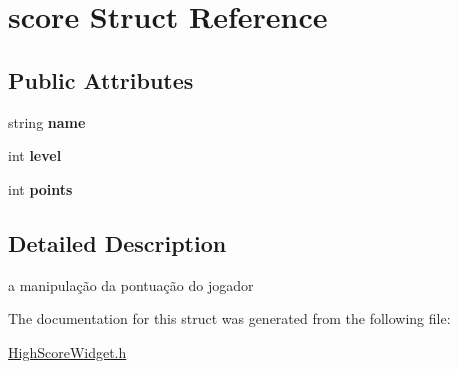 \hypertarget{structscore}{\section{score \-Struct \-Reference}
\label{structscore}
}
\subsection*{\-Public \-Attributes}
\begin{DoxyCompactItemize}
\item 
\hypertarget{structscore_a0c9374eca8c0f875935fc7e6914440c8}{string {\bfseries name}}\label{structscore_a0c9374eca8c0f875935fc7e6914440c8}

\item 
\hypertarget{structscore_ae8e493c1701684bd339dc5a99b18234d}{int {\bfseries level}}\label{structscore_ae8e493c1701684bd339dc5a99b18234d}

\item 
\hypertarget{structscore_ae52021c1e14b8a91c49bfb6166788467}{int {\bfseries points}}\label{structscore_ae52021c1e14b8a91c49bfb6166788467}

\end{DoxyCompactItemize}


\subsection{\-Detailed \-Description}
a manipulação da pontuação do jogador 

\-The documentation for this struct was generated from the following file\-:\begin{DoxyCompactItemize}
\item 
\hyperlink{_high_score_widget_8h}{\-High\-Score\-Widget.\-h}\end{DoxyCompactItemize}
